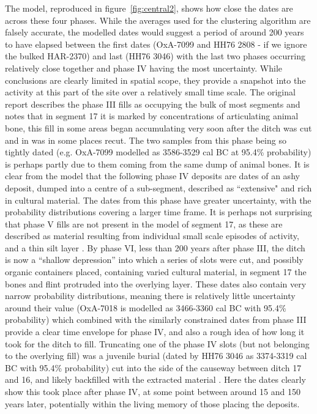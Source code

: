 The model, reproduced in figure~\ref{fig:central2}, shows how close the dates are across these four phases. While the averages used for the clustering algorithm are falsely accurate, the modelled dates would suggest a period of around 200 years to have elapsed between the first dates (OxA-7099 and HH76 2808 - if we ignore the bulked HAR-2370) and last (HH76 3046) with the last two phases occurring relatively close together and phase IV having the most uncertainty. While conclusions are clearly limited in spatial scope, they provide a snapshot into the activity at this part of the site over a relatively small time scale. The original report describes the phase III fills as occupying the bulk of most segments \cite[56]{Mercer:2008fk} and notes that in segment 17 it is marked by concentrations of articulating animal bone, this fill in some areas began accumulating very soon after the ditch was cut and in was in some places recut. The two samples from this phase being so tightly dated (e.g. OxA-7099 modelled as 3586-3529 cal BC at 95.4\% probability) is perhaps partly due to them coming from the same dump of animal bones. It is clear from the model that the following phase IV deposits are dates of an ashy deposit, dumped into a centre of a sub-segment, described as ``extensive"  \cite[56]{Mercer:2008fk} and rich in cultural material. The dates from this phase have greater uncertainty, with the probability distributions covering a larger time frame. It is perhaps not surprising that phase V fills are not present in the model of segment 17, as these are described as material resulting from individual small scale episodes of activity, and a thin silt layer \cite[56]{Mercer:2008fk}. By phase VI, less than 200 years after phase III, the ditch is now a ``shallow depression'' \cite[56]{Mercer:2008fk} into which a series of slots were cut, and possibly organic containers placed, containing varied cultural material, in segment 17 the bones and flint protruded into the overlying layer. These dates also contain very narrow probability distributions, meaning there is relatively little uncertainty around their value (OxA-7018 is modelled as 3466-3360 cal BC with 95.4\% probability) which combined with the similarly constrained dates from phase III provide a clear time envelope for phase IV, and also a rough idea of how long it took for the ditch to fill. Truncating one of the phase IV slots (but not belonging to the overlying fill) was a juvenile burial (dated by HH76 3046 as 3374-3319 cal BC with 95.4\% probability) cut into the side of the causeway between ditch 17 and 16, and likely backfilled with the extracted material \cite[57]{Mercer:2008fk}. Here the dates clearly show this took place after phase IV, at some point between around 15 and 150 years later, potentially within the living memory of those placing the deposits. 

